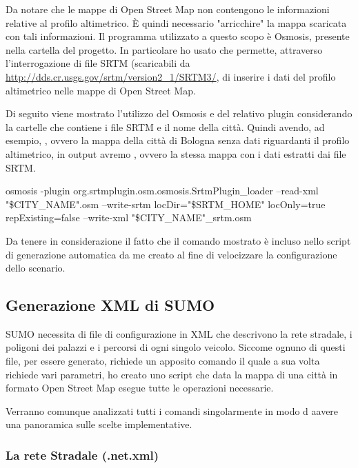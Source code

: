 Da notare che le mappe di Open Street Map non contengono le informazioni relative al profilo altimetrico. È quindi necessario "arricchire" la mappa scaricata con tali informazioni. Il programma utilizzato a questo scopo è Osmosis, presente nella cartella  del progetto. In particolare ho usato  che permette, attraverso l'interrogazione di file SRTM (scaricabili da \url{http://dds.cr.usgs.gov/srtm/version2_1/SRTM3/}, di inserire i dati del profilo altimetrico nelle mappe di Open Street Map. 

Di seguito viene mostrato l'utilizzo del Osmosis e del relativo plugin considerando  la cartelle che contiene i file SRTM e  il nome della città. Quindi avendo, ad esempio, , ovvero la mappa della città di Bologna senza dati riguardanti il profilo altimetrico, in output avremo , ovvero la stessa mappa con i dati estratti dai file SRTM.

\begin{bash}
osmosis -plugin org.srtmplugin.osm.osmosis.SrtmPlugin_loader --read-xml "\$CITY_NAME".osm --write-srtm locDir="\$SRTM_HOME" locOnly=true repExisting=false --write-xml "\$CITY_NAME"_srtm.osm
\end{bash}

%

Da tenere in considerazione il fatto che il comando mostrato è incluso nello script di generazione automatica da me creato al fine di velocizzare la configurazione dello scenario.

\subsection{Generazione XML di SUMO}

SUMO necessita di file di configurazione in XML che descrivono la rete stradale, i poligoni dei palazzi e i percorsi di ogni singolo veicolo. Siccome ognuno di questi file, per essere generato, richiede un apposito comando il quale a sua volta richiede vari parametri, ho creato uno script che data la mappa di una città in formato Open Street Map esegue tutte le operazioni necessarie.

Verranno comunque analizzati tutti i comandi singolarmente in modo d aavere una panoramica sulle scelte implementative.

\subsubsection{La rete Stradale (.net.xml)}

